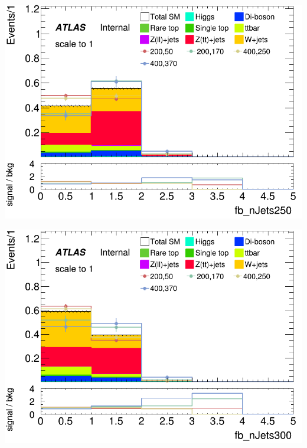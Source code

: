 \documentclass[usenames,dvipsnames]{beamer}
\begin{document}
\begin{frame}
    \begin{minipage}{0.32\textwidth}
        \centering
        \includegraphics[width=\textwidth]{graphics/HH_met_sig/HH_fb_nJets250_norm.png}
    \end{minipage}
    \hfill
    \begin{minipage}{0.32\textwidth}
        \centering
        \includegraphics[width=\textwidth]{graphics/HH_met_sig/HH_fb_nJets300_norm.png}
    \end{minipage}
    \hfill
    \begin{minipage}{0.32\textwidth}
        \centering

\end{minipage}
\end{frame}
\end{document}
